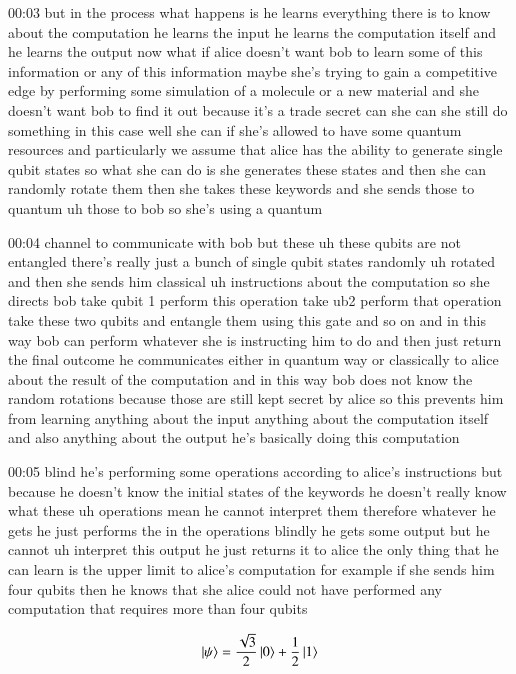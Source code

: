 00:03
but in the process what happens is he learns everything there is to know about
the computation he learns the input he learns the computation itself
and he learns the output now what if alice doesn't want bob to learn
some of this information or any of this information
maybe she's trying to gain a competitive edge by performing some simulation of a
molecule or a new material and she doesn't want
bob to find it out because it's a trade secret
can she can she still do something in this case
well she can if she's allowed to have some quantum resources
and particularly we assume that alice has the ability to generate single qubit
states so what she can do is she generates these states
and then she can randomly rotate them then she takes these keywords and she
sends those to quantum uh those to bob so she's using a quantum

00:04
channel to communicate with bob but these uh these qubits are not
entangled there's really just a bunch of single qubit states randomly uh rotated
and then she sends him classical uh instructions about the computation
so she directs bob take qubit 1 perform this operation take ub2 perform that
operation take these two qubits and entangle them using this gate and so on
and in this way bob can perform whatever she is instructing him to do and then
just return the final outcome he communicates either
in quantum way or classically to alice about the result of the computation
and in this way bob does not know the random rotations
because those are still kept secret by alice so this prevents him from learning
anything about the input anything about the computation itself and also
anything about the output he's basically doing this computation

00:05
blind he's performing some operations according to alice's instructions
but because he doesn't know the initial states of the keywords
he doesn't really know what these uh operations
mean he cannot interpret them therefore whatever he gets he just performs the
in the operations blindly he gets some output
but he cannot uh interpret this output he just returns it to alice
the only thing that he can learn is the upper limit to alice's computation
for example if she sends him four qubits then he knows that she alice
could not have performed any computation that requires more than four qubits


\newpage
\begin{exercises}
\begin{equation*}
\ket{\psi} = \frac{\sqrt{3}}{2}\ket{0} + \frac{1}{2}\ket{1}
\end{equation*}


\end{exercises}

